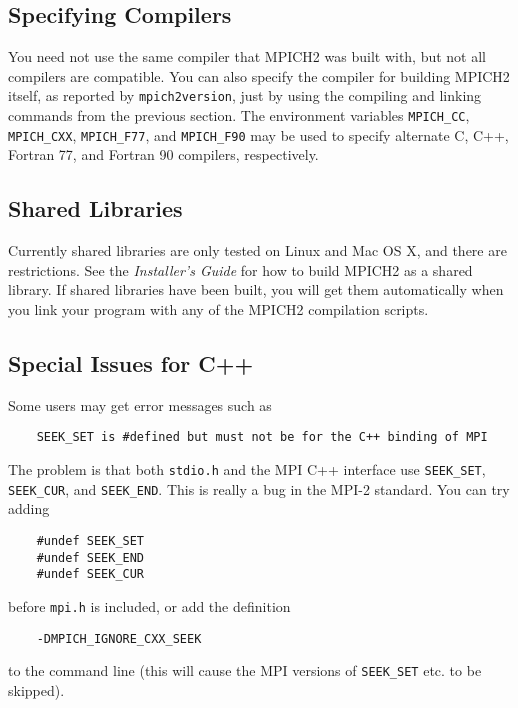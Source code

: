 \documentclass[dvipdfm,11pt]{article}
\begin{document}
\subsection{Specifying Compilers}
\label{sec:specifying-compilers}

You need not use the same compiler that MPICH2 was built with, but not
all compilers are compatible.  You can also specify the compiler for
building MPICH2 itself, as reported by \texttt{mpich2version}, just by
using the compiling and linking commands from the previous section.
The environment variables \texttt{MPICH\_CC}, \texttt{MPICH\_CXX},
\texttt{MPICH\_F77}, and \texttt{MPICH\_F90} may be used to specify
alternate C, C++, Fortran 77, and Fortran 90 compilers, respectively.

\subsection{Shared Libraries}
\label{sec:shared-libraries}

Currently shared libraries are only tested on Linux and Mac OS X, and there are
restrictions.  See the \emph{Installer's Guide} for how to build MPICH2
as a shared library.  If shared libraries have been built, you will
get them automatically when you link your program with any of the
MPICH2 compilation scripts.

\subsection{Special Issues for C++}
\label{sec:cxx}

Some users may get error messages such as
\begin{small}
\begin{verbatim}
    SEEK_SET is #defined but must not be for the C++ binding of MPI
\end{verbatim}
\end{small}
The problem is that both \texttt{stdio.h} and the MPI C++ interface use
\texttt{SEEK\_SET}, \texttt{SEEK\_CUR}, and \texttt{SEEK\_END}.  This is really a bug
in the MPI-2 standard.  You can try adding 
\begin{verbatim}
    #undef SEEK_SET
    #undef SEEK_END
    #undef SEEK_CUR
\end{verbatim}
before \texttt{mpi.h} is included, or add the definition
\begin{verbatim}
    -DMPICH_IGNORE_CXX_SEEK
\end{verbatim}
to the command line (this will cause the MPI versions of \texttt{SEEK\_SET}
etc. to be skipped).
\end{document}
